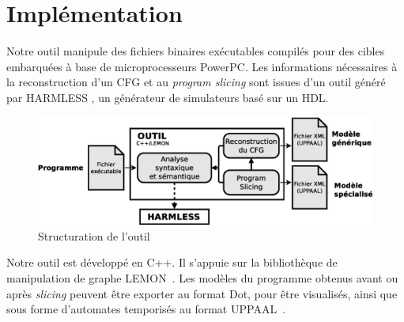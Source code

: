\section{Implémentation}
\label{sec:implementation}
  

  Notre outil manipule des fichiers binaires exécutables compilés pour des
  cibles embarquées à base de microprocesseurs PowerPC. Les informations
  nécessaires à la reconstruction d'un CFG et au \emph{program slicing} sont
  issues d'un outil généré par HARMLESS \cite{KBB12}, un générateur
  de simulateurs basé sur un HDL.

  \begin{figure}[ht]
    \centering
    \includegraphics[scale=.3]{img/archi.eps}
    \caption{Structuration de l'outil}
    \label{fig:implem}
  \end{figure}

    

  Notre outil est développé en C++. Il s'appuie sur la bibliothèque de
  manipulation de graphe LEMON~\cite{DJK11}. Les modèles du programme obtenus avant
  ou après \emph{slicing} peuvent être exporter au format Dot, pour être
  visualisés, ainsi que sous forme d'automates temporisés au format
  UPPAAL~\cite{LPY97}.

